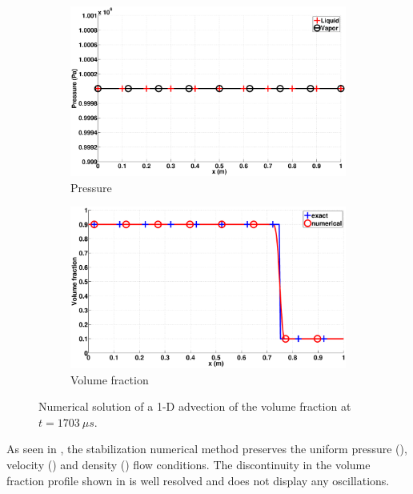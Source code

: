 \documentclass[preprint,10pt]{elsarticle}
\begin{document}
\begin{figure}[H]
        \begin{subfigure}[b]{0.495\textwidth}
                \centering
                \includegraphics[width=\textwidth]{figures/vf-shock_two_phases_pressure.eps}
                \caption{Pressure}
                \label{fig:adv-vf-press}
        \end{subfigure}        
        \begin{subfigure}[b]{0.495\textwidth}
                \centering
                \includegraphics[width=\textwidth]{figures/advection-vol-fraction.eps}
                \caption{Volume fraction}
                \label{fig:adv-vf-vf}
        \end{subfigure}
        \caption{Numerical solution of a 1-D advection of the volume fraction at $t=1703 \ \mu s$.}\label{fig:adv-vf-variables}
\end{figure}
%
As seen in , the stabilization numerical method preserves the uniform pressure (), velocity () and density () flow conditions. The discontinuity in the volume fraction profile shown in  is well resolved and does not display any oscillations.
\end{document}
